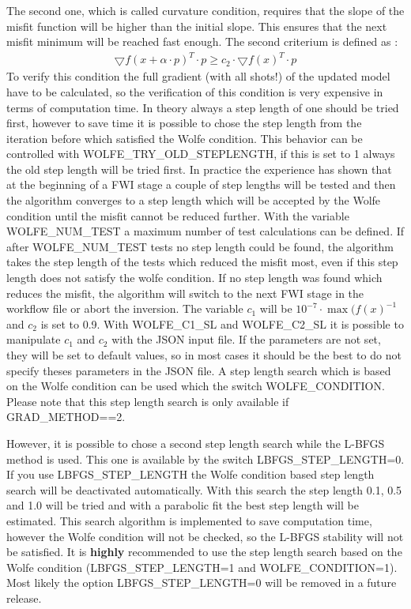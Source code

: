 The second one, which is called curvature condition, requires that the slope of the misfit function will be higher than the initial slope. This ensures that the next misfit minimum will be reached fast enough.
The second criterium is defined as \citep{nocedal:1999}:
\begin{align}
	\bigtriangledown f(x+\alpha \cdot p)^{T} \cdot p \geq c_2 \cdot\bigtriangledown f(x)^{T} \cdot p
\end{align}
To verify this condition the full gradient (with all shots!) of the updated model have to be calculated, so the verification of this condition is very expensive in terms of computation time. In theory always a step length of one should be tried first, however to save time it is possible to chose the step length from the iteration before which satisfied the Wolfe condition. This behavior can be controlled with WOLFE\_TRY\_OLD\_STEPLENGTH, if this is set to 1 always the old step length will be tried first. In practice the experience has shown that at the beginning of a FWI stage a couple of step lengths will be tested and then the algorithm converges to a step length which will be accepted by the Wolfe condition until the misfit cannot be reduced further. With the variable WOLFE\_NUM\_TEST a maximum number of test calculations can be defined. If after WOLFE\_NUM\_TEST tests no step length could be found, the algorithm takes the step length of the tests which reduced the misfit most, even if this step length does not satisfy the wolfe condition. If no step length was found which reduces the misfit, the algorithm will switch to the next FWI stage in the workflow file or abort the inversion. 
The variable $c_1$ will be $10^{-7}\cdot \max(f(x)^{-1}$ and $c_2$ is set to 0.9. With WOLFE\_C1\_SL and WOLFE\_C2\_SL it is possible to manipulate $c_1$ and $c_2$ with the JSON input file. If the parameters are not set, they will be set to default values, so in most cases it should be the best to do not specify theses parameters in the JSON file.
A step length search which is based on the Wolfe condition can be used which the switch WOLFE\_CONDITION. Please note that this step length search is only available if GRAD\_METHOD==2. 

However, it is possible to chose a second step length search while the L-BFGS method is used. This one is available by the switch LBFGS\_STEP\_LENGTH=0. If you use LBFGS\_STEP\_LENGTH the Wolfe condition based step length search will be deactivated automatically. With this search the step length 0.1, 0.5 and 1.0 will be tried and with a parabolic fit the best step length will be estimated. This search algorithm is implemented to save computation time, however the Wolfe condition will not be checked, so the L-BFGS stability will not be satisfied. It is \textbf{highly} recommended to use the step length search based on the Wolfe condition (LBFGS\_STEP\_LENGTH=1 and WOLFE\_CONDITION=1). Most likely the option LBFGS\_STEP\_LENGTH=0 will be removed in a future release. 


